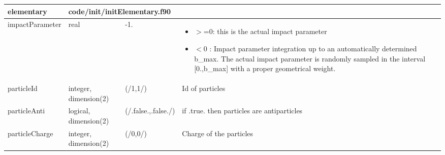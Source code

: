 \documentclass{article}
\begin{document}
\begin{longtable}{llll}
\toprule
\textbf{\large{elementary}} & \multicolumn{3}{l}{\footnotesize{code/init/initElementary.f90}}\\*
\midrule
\endfirsthead
\midrule
\endhead
impactParameter & \begin{minipage}[t]{2cm}real\end{minipage} & \begin{minipage}[t]{2cm}-1.\end{minipage} & \begin{minipage}[t]{12cm}\begin{itemize}\leftmargin0em\itemindent0pt\item $>$=0: this is the actual impact parameter\item $<$0 : Impact parameter integration up to an automatically determined b\_max.   The actual impact parameter is randomly sampled in the interval   [0.,b\_max] with a proper geometrical weight.\end{itemize}\end{minipage}\\*
\midrule
particleId & \begin{minipage}[t]{2cm}integer, dimension(2)\end{minipage} & \begin{minipage}[t]{2cm}(/1,1/)\end{minipage} & \begin{minipage}[t]{12cm}Id of particles\end{minipage}\\*
\midrule
particleAnti & \begin{minipage}[t]{2cm}logical, dimension(2)\end{minipage} & \begin{minipage}[t]{2cm}(/.false.,.false./)\end{minipage} & \begin{minipage}[t]{12cm}if .true. then particles are antiparticles\end{minipage}\\*
\midrule
particleCharge & \begin{minipage}[t]{2cm}integer, dimension(2)\end{minipage} & \begin{minipage}[t]{2cm}(/0,0/)\end{minipage} & \begin{minipage}[t]{12cm}Charge of the particles\end{minipage}\\*

\end{longtable}
\end{document}
